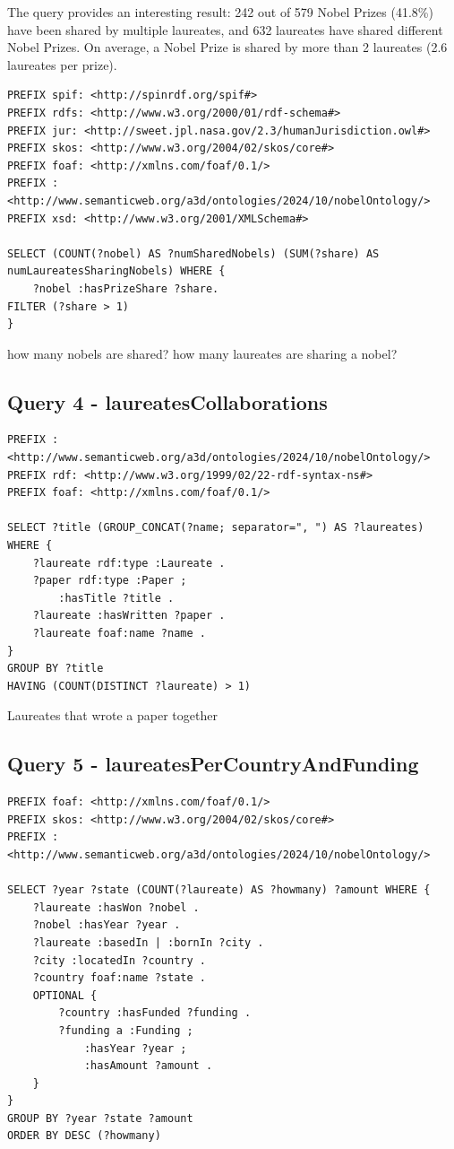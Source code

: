\documentclass{article}
\begin{document}
The query provides an interesting result: 242 out of 579 Nobel Prizes (41.8\%) have
been shared by multiple laureates, and 632 laureates have shared different Nobel Prizes.
On average, a Nobel Prize is shared by more than 2 laureates (2.6 laureates per prize).

\begin{lstlisting}
PREFIX spif: <http://spinrdf.org/spif#>
PREFIX rdfs: <http://www.w3.org/2000/01/rdf-schema#>
PREFIX jur: <http://sweet.jpl.nasa.gov/2.3/humanJurisdiction.owl#>
PREFIX skos: <http://www.w3.org/2004/02/skos/core#>
PREFIX foaf: <http://xmlns.com/foaf/0.1/>
PREFIX : <http://www.semanticweb.org/a3d/ontologies/2024/10/nobelOntology/>
PREFIX xsd: <http://www.w3.org/2001/XMLSchema#>

SELECT (COUNT(?nobel) AS ?numSharedNobels) (SUM(?share) AS numLaureatesSharingNobels) WHERE {
    ?nobel :hasPrizeShare ?share.
FILTER (?share > 1)
}
\end{lstlisting}

how many nobels are shared? how many laureates are sharing a nobel?


\subsection*{Query 4 - laureatesCollaborations}

\begin{lstlisting}
PREFIX : <http://www.semanticweb.org/a3d/ontologies/2024/10/nobelOntology/>
PREFIX rdf: <http://www.w3.org/1999/02/22-rdf-syntax-ns#>
PREFIX foaf: <http://xmlns.com/foaf/0.1/>

SELECT ?title (GROUP_CONCAT(?name; separator=", ") AS ?laureates) WHERE {
    ?laureate rdf:type :Laureate .
    ?paper rdf:type :Paper ;
        :hasTitle ?title . 
    ?laureate :hasWritten ?paper .
    ?laureate foaf:name ?name .
}
GROUP BY ?title
HAVING (COUNT(DISTINCT ?laureate) > 1)    
\end{lstlisting}

Laureates that wrote a paper together

\subsection*{Query 5 - laureatesPerCountryAndFunding}

\begin{lstlisting}
PREFIX foaf: <http://xmlns.com/foaf/0.1/>
PREFIX skos: <http://www.w3.org/2004/02/skos/core#>
PREFIX : <http://www.semanticweb.org/a3d/ontologies/2024/10/nobelOntology/>

SELECT ?year ?state (COUNT(?laureate) AS ?howmany) ?amount WHERE {
    ?laureate :hasWon ?nobel .
    ?nobel :hasYear ?year .
    ?laureate :basedIn | :bornIn ?city .
    ?city :locatedIn ?country .
    ?country foaf:name ?state .
    OPTIONAL {
        ?country :hasFunded ?funding .
        ?funding a :Funding ;
            :hasYear ?year ;
            :hasAmount ?amount .
    }
} 
GROUP BY ?year ?state ?amount
ORDER BY DESC (?howmany)    
\end{lstlisting}
\end{document}
